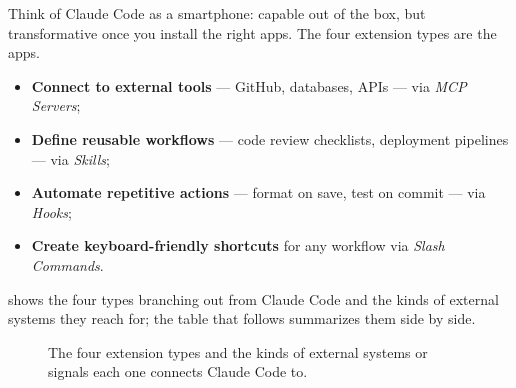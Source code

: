 Think of Claude Code as a smartphone: capable out of the box, but transformative
once you install the right apps. The four extension types are the apps.

\begin{itemize}
  \item \textbf{Connect to external tools} — GitHub, databases, APIs —
        via \emph{MCP Servers};
  \item \textbf{Define reusable workflows} — code review checklists, deployment
        pipelines — via \emph{Skills};
  \item \textbf{Automate repetitive actions} — format on save, test on commit —
        via \emph{Hooks};
  \item \textbf{Create keyboard-friendly shortcuts} for any workflow via
        \emph{Slash Commands}.
\end{itemize}

 shows the four types branching out from
Claude Code and the kinds of external systems they reach for; the table
that follows summarizes them side by side.

\begin{figure}[ht]
\centering
{}
\caption{The four extension types and the kinds of external systems
or signals each one connects Claude Code to.}
\label{fig:extension-map}
\end{figure}

